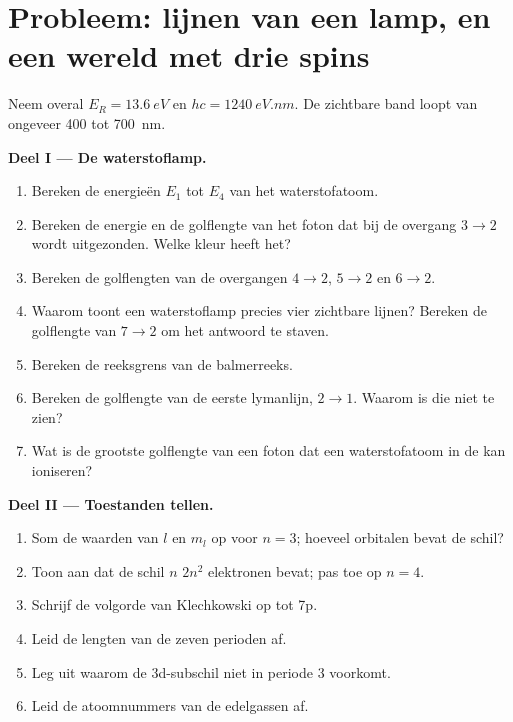 \section{Probleem: lijnen van een lamp, en een wereld met drie spins}

\begin{problem}
\label{pb:b1:quantum-numbers:1}
Neem overal $E_R = \qty{13.6}{eV}$ en $hc = \qty{1240}{eV.nm}$. De
zichtbare band loopt van ongeveer 400 tot \qty{700}{nm}.

\medskip
\noindent\textbf{Deel I --- De waterstoflamp.}
\begin{enumerate}
  \item Bereken de energieën $E_1$ tot $E_4$ van het waterstofatoom.
  \item Bereken de energie en de golflengte van het foton dat bij de
        overgang $3 \to 2$ wordt uitgezonden. Welke kleur heeft het?
  \item Bereken de golflengten van de overgangen $4 \to 2$, $5 \to 2$
        en $6 \to 2$.
  \item Waarom toont een waterstoflamp precies vier zichtbare lijnen?
        Bereken de golflengte van $7 \to 2$ om het antwoord te staven.
  \item Bereken de reeksgrens van de balmerreeks.
  \item Bereken de golflengte van de eerste lymanlijn, $2 \to 1$. Waarom
        is die niet te zien?
  \item Wat is de grootste golflengte van een foton dat een waterstofatoom
        in de  kan ioniseren?
\end{enumerate}

\medskip
\noindent\textbf{Deel II --- Toestanden tellen.}
\begin{enumerate}[resume]
  \item Som de waarden van $l$ en $m_l$ op voor $n = 3$; hoeveel orbitalen
        bevat de schil?
  \item Toon aan dat de schil $n$ $2n^2$ elektronen bevat; pas toe op
        $n = 4$.
  \item Schrijf de volgorde van Klechkowski op tot 7p.
  \item Leid de lengten van de zeven perioden af.
  \item Leg uit waarom de 3d-subschil niet in periode 3 voorkomt.
  \item Leid de atoomnummers van de edelgassen af.
\end{enumerate}


\end{problem}
